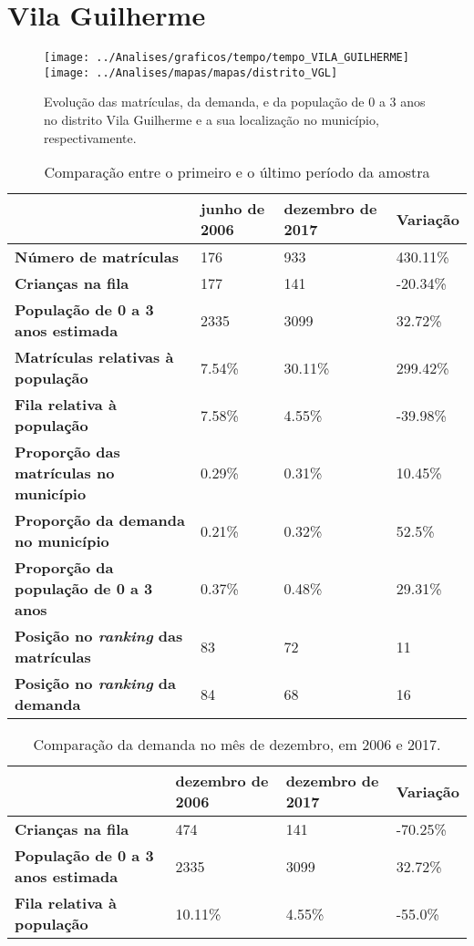 \section{Vila Guilherme}
\begin{figure}[H]
\centering
\texttt{[image: ../Analises/graficos/tempo/tempo\_VILA\_GUILHERME]}
\texttt{[image: ../Analises/mapas/mapas/distrito\_VGL]}
\caption{Evolução das matrículas, da demanda, e da população de 0 a 3 anos no distrito Vila Guilherme e a sua localização no município, respectivamente.}
\end{figure}
\begin{table}[H]
\begin{tabular}{l|l|l|l}
\textbf{}                                      & \textbf{junho de 2006}       & \textbf{dezembro de 2017}    & \textbf{Variação} \\ \hline
\textbf{Número de matrículas}                  & 176 & 933 & 430.11\% \\ \hline
\textbf{Crianças na fila}                      & 177 & 141 & -20.34\% \\ \hline
\textbf{População de 0 a 3 anos estimada}      & 2335 & 3099 & 32.72\% \\ \hline
\textbf{Matrículas relativas à população}      & 7.54\% & 30.11\% & 299.42\% \\ \hline
\textbf{Fila relativa à população}             & 7.58\% & 4.55\% & -39.98\% \\ \hline
\textbf{Proporção das matrículas no município} & 0.29\% & 0.31\% & 10.45\% \\ \hline
\textbf{Proporção da demanda no município}     & 0.21\% & 0.32\% & 52.5\% \\ \hline
\textbf{Proporção da população de 0 a 3 anos}  & 0.37\% & 0.48\% & 29.31\% \\ \hline
\textbf{Posição no \textit{ranking} das matrículas}     & 83 & 72 & 11 \\ \hline
\textbf{Posição no \textit{ranking} da demanda}         & 84 & 68 & 16 \\ 
\end{tabular}
\caption{Comparação entre o primeiro e o último período da amostra}
\end{table}
\begin{table}[H]
\begin{tabular}{l|l|l|l}
\textbf{}                                 & \textbf{dezembro de 2006} & \textbf{dezembro de 2017} & \textbf{Variação} \\ \hline
\textbf{Crianças na fila}                      & 474 & 141 & -70.25\% \\ \hline
\textbf{População de 0 a 3 anos estimada}      & 2335 & 3099 & 32.72\% \\ \hline
\textbf{Fila relativa à população}             & 10.11\% & 4.55\% & -55.0\% \\
\end{tabular}
\caption{Comparação da demanda no mês de dezembro, em 2006 e 2017.}
\end{table}

